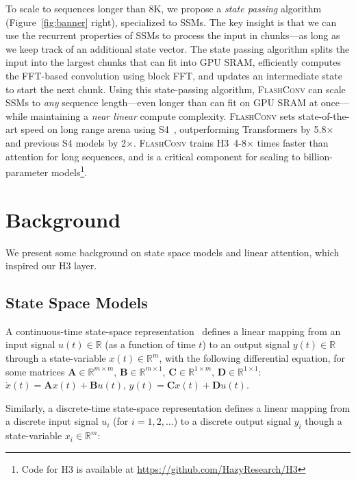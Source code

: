 To scale to sequences longer than 8K, we propose a \textit{state passing} algorithm (Figure~\ref{fig:banner} right), specialized to SSMs. The key insight is that we can use the recurrent properties of SSMs to process the input in chunks---as long as we keep track of an additional state vector. The state passing algorithm splits the input into the largest chunks that can fit into GPU SRAM, efficiently computes the FFT-based convolution using block FFT, and updates an intermediate state to start the next chunk. Using this state-passing algorithm, \textsc{FlashConv} can scale SSMs to \textit{any} sequence length---even longer than can fit on GPU SRAM at once---while maintaining a \textit{near linear} compute complexity.
\textsc{FlashConv} sets state-of-the-art speed on long range arena using S4~\citep{gu2022efficiently}, outperforming Transformers by 5.8$\times$ and previous S4 models by 2$\times$.
\textsc{FlashConv} trains \textsc{H3}\ 4-8$\times$ times faster than attention for long sequences, and is a critical component for scaling to billion-parameter models\footnote{Code for H3 is available at \url{https://github.com/HazyResearch/H3} }.

\section{Background}
\label{sec:background}

We present some background on state space models and linear attention, which inspired our H3 layer.

\subsection{State Space Models}

A continuous-time state-space representation~\citep{brogan1974modern} defines a linear mapping from an input signal $u(t) \in \mathbb{R}$ (as a function of time $t$) to an output signal $y(t) \in \mathbb{R}$ through a state-variable $x(t) \in \mathbb{R}^m$, with the following differential equation, for some matrices $\mathbf{A} \in \mathbb{R}^{m \times m}$, $\mathbf{B} \in \mathbb{R}^{m \times 1}$, $\mathbf{C} \in \mathbb{R}^{1 \times m}$,
$\mathbf{D} \in \mathbb{R}^{1 \times 1}$: $\dot{x}(t) = \mathbf{A} x(t) + \mathbf{B} u(t)$, $y(t) = \mathbf{C} x(t) + \mathbf{D} u(t)$.

Similarly, a discrete-time state-space representation defines a linear mapping from a discrete input signal $u_i$ (for $i = 1, 2, \dots$) to a discrete output signal $y_i$ though a state-variable $x_i \in \mathbb{R}^m$:

